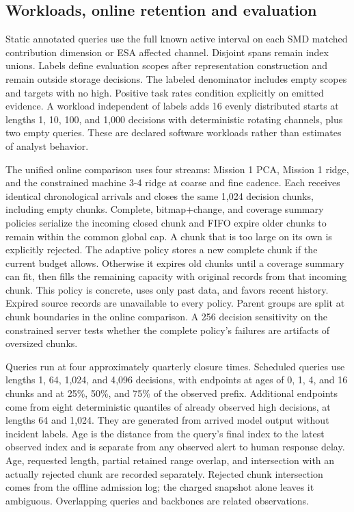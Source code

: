 \documentclass[a4paper,fleqn]{cas-dc}
\begin{document}
\subsection{Workloads, online retention and evaluation}

Static annotated queries use the full known active interval on each SMD matched contribution dimension or ESA affected channel. Disjoint spans remain index unions. Labels define evaluation scopes after representation construction and remain outside storage decisions. The labeled denominator includes empty scopes and targets with no high. Positive task rates condition explicitly on emitted evidence. A workload independent of labels adds 16 evenly distributed starts at lengths 1, 10, 100, and 1{,}000 decisions with deterministic rotating channels, plus two empty queries. These are declared software workloads rather than estimates of analyst behavior.

The unified online comparison uses four streams: Mission 1 PCA, Mission 1 ridge, and the constrained machine 3-4 ridge at coarse and fine cadence. Each receives identical chronological arrivals and closes the same 1{,}024 decision chunks, including empty chunks. Complete, bitmap\allowbreak+change, and coverage summary policies serialize the incoming closed chunk and FIFO expire older chunks to remain within the common global cap. A chunk that is too large on its own is explicitly rejected. The adaptive policy stores a new complete chunk if the current budget allows. Otherwise it expires old chunks until a coverage summary can fit, then fills the remaining capacity with original records from that incoming chunk. This policy is concrete, uses only past data, and favors recent history. Expired source records are unavailable to every policy. Parent groups are split at chunk boundaries in the online comparison. A 256 decision sensitivity on the constrained server tests whether the complete policy's failures are artifacts of oversized chunks.

Queries run at four approximately quarterly closure times. Scheduled queries use lengths 1, 64, 1{,}024, and 4{,}096 decisions, with endpoints at ages of 0, 1, 4, and 16 chunks and at 25\%, 50\%, and 75\% of the observed prefix. Additional endpoints come from eight deterministic quantiles of already observed high decisions, at lengths 64 and 1{,}024. They are generated from arrived model output without incident labels. Age is the distance from the query's final index to the latest observed index and is separate from any observed alert to human response delay. Age, requested length, partial retained range overlap, and intersection with an actually rejected chunk are recorded separately. Rejected chunk intersection comes from the offline admission log; the charged snapshot alone leaves it ambiguous. Overlapping queries and backbones are related observations.
\end{document}
